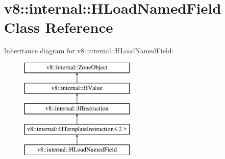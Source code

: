 \hypertarget{classv8_1_1internal_1_1_h_load_named_field}{}\section{v8\+:\+:internal\+:\+:H\+Load\+Named\+Field Class Reference}
\label{classv8_1_1internal_1_1_h_load_named_field}
Inheritance diagram for v8\+:\+:internal\+:\+:H\+Load\+Named\+Field\+:\begin{figure}[H]
\begin{center}
\leavevmode
\includegraphics[height=5.000000cm]{classv8_1_1internal_1_1_h_load_named_field}
\end{center}
\end{figure}
